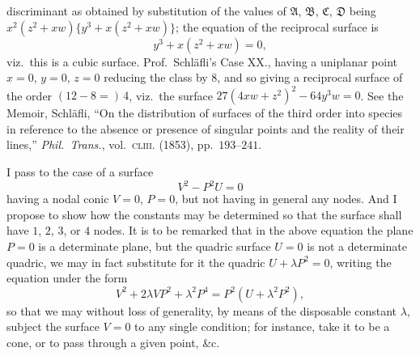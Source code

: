 \documentclass[11pt,a4paper]{article}
\begin{document}
discriminant as obtained by substitution of the values of $\mathfrak{A}$,
$\mathfrak{B}$, $\mathfrak{C}$, $\mathfrak{D}$ being
$x^{2} (z^{2} + x w)\{ y^{3} + x (z^{2} + x w)\}$; the equation of the
reciprocal surface is
\[
y^{3} + x (z^{2} + x w) = 0,
\]
viz.\ this is a cubic surface. Prof.\ Schl\"afli's Case XX., having a
uniplanar point $x = 0$, $y = 0$, $z = 0$ reducing the class by $8$, and
so giving a reciprocal surface of the order $(12 - 8 =)\,4$, viz.\ the
surface $27 (4 x w + z^{2})^{2} - 64 y^{3} w = 0$. See the Memoir,
Schl\"afli, ``On the distribution of surfaces of the third order into
species in reference to the absence or presence of singular points and
the reality of their lines,'' \textit{Phil.\ Trans.}, vol.\ \textsc{cliii.}
(1853), pp.~$193$--$241$.

\medskip

I pass to the case of a surface
\[
V^{2} - P^{2} U = 0
\]
having a nodal conic $V = 0$, $P = 0$, but not having in general any
nodes. And I propose to show how the constants may be determined so that
the surface shall have $1$, $2$, $3$, or $4$ nodes. It is to be remarked
that in the above equation the plane $P = 0$ is a determinate plane, but
the quadric surface $U = 0$ is not a determinate quadric, we may in fact
substitute for it the quadric $U + \lambda P^{2} = 0$, writing the
equation under the form
\[
V^{2} + 2 \lambda V P^{2} + \lambda^{2} P^{4} = P^{2} (U + \lambda^{2}P^{2}),
\]
so that we may without loss of generality, by means of the disposable
constant $\lambda$, subject the surface $V = 0$ to any single condition;
for instance, take it to be a cone, or to pass through a given point,
\&c.
\end{document}
